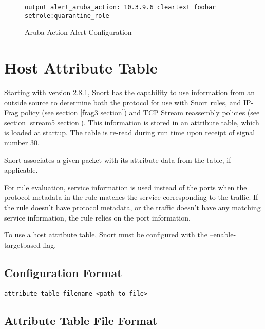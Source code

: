 \documentclass[english]{report}
\newenvironment{note}{
\samepage
    \vspace{10pt}{\textsf{
        {\hspace{7pt}\Huge{$\triangle$\hspace{-12.5pt}{\Large{$^!$}}}}\hspace{5pt}
        {\Large{NOTE}}
    }
    }
   \begin{center}
    \par\vspace{-17pt}

    \begin{lrbox}{\savepar}
    \begin{minipage}[r]{6in}
}
{
    \end{minipage}
    \end{lrbox}
    \fbox{
        \usebox{
            \savepar
	}
    }
    \par\vskip10pt
    \end{center}
}
\begin{document}
\begin{figure}[!hbpt]
\begin{verbatim}
output alert_aruba_action: 10.3.9.6 cleartext foobar setrole:quarantine_role
\end{verbatim}

\caption{\label{aruba_action configuration}Aruba Action Alert Configuration}
\end{figure}

\section{Host Attribute Table \label{targetbased}}

Starting with version 2.8.1, Snort has the capability to use information
from an outside source to determine both the protocol for use with
Snort rules, and IP-Frag policy (see section \ref{frag3 section}) and TCP
Stream reassembly policies (see section \ref{stream5 section}).  This
information is stored in an attribute table, which is loaded at startup.
The table is re-read during run time upon receipt of signal number 30.

Snort associates a given packet with its attribute data from the table,
if applicable.

For rule evaluation, service information is used instead of the ports when
the protocol metadata in the rule matches the service corresponding to the
traffic.  If the rule doesn't have protocol metadata, or the traffic
doesn't have any matching service information, the rule relies on the port
information.

\begin{note}
To use a host attribute table, Snort must be configured with the
--enable-targetbased flag.
\end{note}

\subsection{Configuration Format}

\begin{center}
\begin{verbatim}
attribute_table filename <path to file>
\end{verbatim}
\end{center}

\subsection{Attribute Table File Format}
\end{document}
